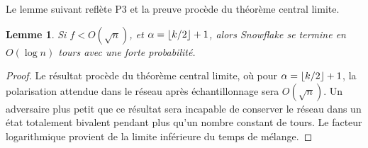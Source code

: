 \documentclass[letterpaper,twocolumn,10pt]{article}
\DeclarePairedDelimiter{\floor}{\lfloor}{\rfloor}
\newcommand{\Oh}[1]{O(#1)}
\newtheorem{lemma}[theorem]{Lemme}
\theoremstyle{definition}
\begin{document}
\begin{appendices}
Le lemme suivant reflète P3 et la preuve procède du théorème central limite.
\begin{lemma}
Si $f < \Oh{\sqrt{n}}$, et $\alpha = \floor{k/2} + 1$, alors Snowflake se termine en $\Oh{\log n}$ tours avec une forte probabilité. 
\label{lemma:centrallimit}
\end{lemma}
\begin{proof}
Le résultat procède du théorème central limite, où pour $\alpha = \floor{k/2} + 1$, la polarisation %
attendue dans le réseau après échantillonnage sera $\Oh{\sqrt{n}}$. Un adversaire plus petit que ce résultat sera incapable de conserver le réseau dans un état totalement bivalent pendant plus qu'un nombre constant de tours. Le facteur logarithmique provient de la limite inférieure du temps de mélange. %
\end{proof}


\end{appendices}
\end{document}
